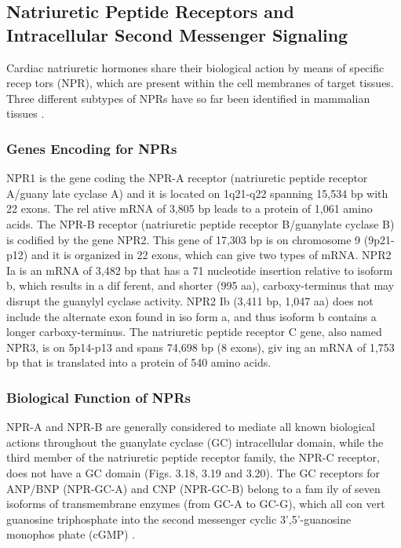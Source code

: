 \documentclass[14pt,a4paper,onecolumn]{extarticle}
\begin{document}
\subsection{Natriuretic Peptide Receptors and Intracellular Second Messenger Signaling}
Cardiac natriuretic hormones share their biological action by means of specific recep tors (NPR), which are present within the cell membranes of target tissues. Three different subtypes of NPRs have so far been identified in mammalian tissues \citep{112} \citep{164} \citep{165}.

\subsubsection{Genes Encoding for NPRs}
NPR1 is the gene coding the NPR-A receptor (natriuretic peptide receptor A/guany late cyclase A) and it is located on 1q21-q22 spanning 15,534 bp with 22 exons. The rel ative mRNA of 3,805 bp leads to a protein of 1,061 amino acids.  The NPR-B receptor (natriuretic peptide receptor B/guanylate cyclase B) is codified by the gene NPR2. This gene of 17,303 bp is on chromosome 9 (9p21-p12) and it is organized in 22 exons, which can give two types of mRNA. NPR2 Ia is an mRNA of 3,482 bp that has a 71 nucleotide insertion relative to isoform b, which results in a dif ferent, and shorter (995 aa), carboxy-terminus that may disrupt the guanylyl cyclase activity. NPR2 Ib (3,411 bp, 1,047 aa) does not include the alternate exon found in iso form a, and thus isoform b contains a longer carboxy-terminus. The natriuretic peptide receptor C gene, also named NPR3, is on 5p14-p13 and spans 74,698 bp (8 exons), giv ing an mRNA of 1,753 bp that is translated into a protein of 540 amino acids.

\subsubsection{Biological Function of NPRs}
NPR-A and NPR-B are generally considered to mediate all known biological actions throughout the guanylate cyclase (GC) intracellular domain, while the third member of the natriuretic peptide receptor family, the NPR-C receptor, does not have a GC domain (Figs. 3.18, 3.19 and 3.20).  The GC receptors for ANP/BNP (NPR-GC-A) and CNP (NPR-GC-B) belong to a fam ily of seven isoforms of transmembrane enzymes (from GC-A to GC-G), which all con vert guanosine triphosphate into the second messenger cyclic 3’,5’-guanosine monophos phate (cGMP) \citep{164}.
\end{document}
